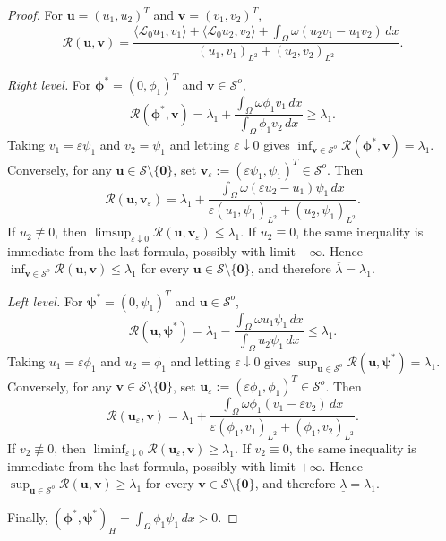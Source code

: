 \documentclass[preprint,10pt]{elsarticle}
\theoremstyle{plain}
\theoremstyle{definition}
\theoremstyle{remark}
\begin{document}
\begin{proof}
	For $\mathbf u=(u_1,u_2)^T$ and $\mathbf v=(v_1,v_2)^T$,
	\[
	\mathcal R(\mathbf u,\mathbf v)
	=
	\frac{
		\langle\mathcal L_0u_1,v_1\rangle
		+\langle\mathcal L_0u_2,v_2\rangle
		+\displaystyle\int_\Omega\omega(u_2v_1-u_1v_2)\,dx
	}{
		(u_1,v_1)_{L^2}+(u_2,v_2)_{L^2}
	}.
	\]
	
	\noindent\textit{Right level.}
	For $\boldsymbol\phi^*=(0,\phi_1)^T$ and $\mathbf v\in\mathcal S^o$,
	\[
	\mathcal R(\boldsymbol\phi^*,\mathbf v)
	=
	\lambda_1
	+\frac{\displaystyle\int_\Omega\omega\phi_1v_1\,dx}
	{\displaystyle\int_\Omega\phi_1v_2\,dx}
	\ge\lambda_1.
	\]
	Taking $v_1=\varepsilon\psi_1$ and $v_2=\psi_1$ and letting
	$\varepsilon\downarrow0$ gives
	$\inf_{\mathbf v\in\mathcal S^o}\mathcal R(\boldsymbol\phi^*,\mathbf v)=\lambda_1$.
	Conversely, for any $\mathbf u\in\mathcal S\setminus\{\mathbf0\}$, set
	$\mathbf v_\varepsilon:=(\varepsilon\psi_1,\psi_1)^T\in\mathcal S^o$. Then
	\[
	\mathcal R(\mathbf u,\mathbf v_\varepsilon)
	=
	\lambda_1
	+\frac{\displaystyle\int_\Omega\omega(\varepsilon u_2-u_1)\psi_1\,dx}
	{\displaystyle\varepsilon(u_1,\psi_1)_{L^2}+(u_2,\psi_1)_{L^2}}.
	\]
	If $u_2\not\equiv0$, then
	$\limsup_{\varepsilon\downarrow0}\mathcal R(\mathbf u,\mathbf v_\varepsilon)\le\lambda_1$.
	If $u_2\equiv0$, the same inequality is immediate from the last formula,
	possibly with limit $-\infty$. Hence
	$\inf_{\mathbf v\in\mathcal S^o}\mathcal R(\mathbf u,\mathbf v)\le\lambda_1$
	for every $\mathbf u\in\mathcal S\setminus\{\mathbf0\}$, and therefore
	$\overline\lambda=\lambda_1$.
	
	\smallskip
	\noindent\textit{Left level.}
	For $\boldsymbol\psi^*=(0,\psi_1)^T$ and $\mathbf u\in\mathcal S^o$,
	\[
	\mathcal R(\mathbf u,\boldsymbol\psi^*)
	=
	\lambda_1
	-\frac{\displaystyle\int_\Omega\omega u_1\psi_1\,dx}
	{\displaystyle\int_\Omega u_2\psi_1\,dx}
	\le\lambda_1.
	\]
	Taking $u_1=\varepsilon\phi_1$ and $u_2=\phi_1$ and letting
	$\varepsilon\downarrow0$ gives
	$\sup_{\mathbf u\in\mathcal S^o}\mathcal R(\mathbf u,\boldsymbol\psi^*)=\lambda_1$.
	Conversely, for any $\mathbf v\in\mathcal S\setminus\{\mathbf0\}$, set
	$\mathbf u_\varepsilon:=(\varepsilon\phi_1,\phi_1)^T\in\mathcal S^o$. Then
	\[
	\mathcal R(\mathbf u_\varepsilon,\mathbf v)
	=
	\lambda_1
	+\frac{\displaystyle\int_\Omega\omega\phi_1(v_1-\varepsilon v_2)\,dx}
	{\displaystyle\varepsilon(\phi_1,v_1)_{L^2}+(\phi_1,v_2)_{L^2}}.
	\]
	If $v_2\not\equiv0$, then
	$\liminf_{\varepsilon\downarrow0}\mathcal R(\mathbf u_\varepsilon,\mathbf v)\ge\lambda_1$.
	If $v_2\equiv0$, the same inequality is immediate from the last formula,
	possibly with limit $+\infty$. Hence
	$\sup_{\mathbf u\in\mathcal S^o}\mathcal R(\mathbf u,\mathbf v)\ge\lambda_1$
	for every $\mathbf v\in\mathcal S\setminus\{\mathbf0\}$, and therefore
	$\underline\lambda=\lambda_1$.
	
	Finally,
	$(\boldsymbol\phi^*,\boldsymbol\psi^*)_H=\int_\Omega\phi_1\psi_1\,dx>0$.
\end{proof}
\end{document}

